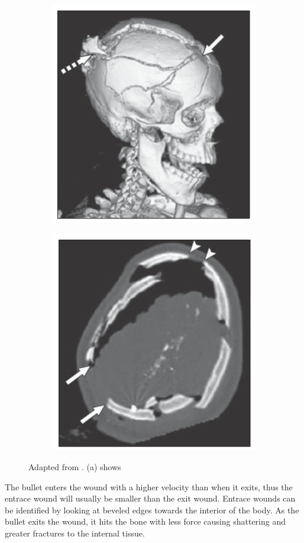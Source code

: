 \documentclass[titlepage]{article}
\begin{document}
\begin{figure}[h!]
\centering
\begin{subfigure}{.5\textwidth}
  \centering
  \includegraphics[width=.7\linewidth]{gunshot1}
  \end{subfigure}%
\begin{subfigure}{.5\textwidth}
  \centering
  \includegraphics[width=.7\linewidth]{gunshot2}
\end{subfigure}
\caption{Adapted from \cite{ballistic-trauma}. (a) shows }
\label{fig:gunshot}
\end{figure}


The bullet enters the wound with a higher velocity than when it exits, thus the entrace wound will usually be smaller than the exit wound. Entrace wounds can be identified by looking at beveled edges towards the interior of the body. As the bullet exits the wound, it hits the bone with less force causing shattering and greater fractures to the internal tissue.
\end{document}
